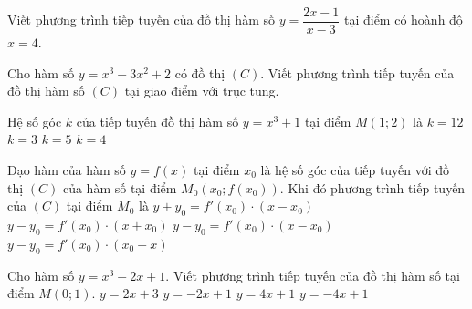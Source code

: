 \begin{ex}%
	Viết phương trình tiếp tuyến của đồ thị hàm số $y=\dfrac{2x-1}{x-3}$ tại điểm có hoành độ $x=4$. 
\end{ex}

\begin{ex}%
	 Cho hàm số $y=x^3-3x^2+2$ có đồ thị $(C)$. Viết phương trình tiếp tuyến của đồ thị hàm số $(C)$ tại giao điểm với trục tung.
\end{ex}

\begin{ex}%
	Hệ số góc $k$ của tiếp tuyến  đồ thị hàm số $y = x^3 + 1$ tại điểm $M(1; 2)$ là
	 \choice
		 {$k = 12$}
		 {\True $k = 3$}
		 {$k = 5$}
		{$k  = 4$}
\end{ex}

\begin{ex}%
	Đạo hàm của hàm số $y= f(x)$ tại điểm $x_0$ là hệ số góc của tiếp tuyến với đồ thị $(C)$ của hàm số tại điểm $M_0(x_0; f(x_0))$. Khi đó phương trình tiếp tuyến của $(C)$ tại điểm $M_0$  là
	\choice 
		{$y+y_0=f'(x_0)\cdot  (x-x_0)$}
		{$y-y_0=f'(x_0)\cdot  (x+x_0)$}
		{\True $y-y_0=f'(x_0)\cdot  (x-x_0)$}
		{$y-y_0=f'(x_0)\cdot  (x_0-x)$}
	\loigiai{ 
	 }
\end{ex}

\begin{ex}%
	Cho hàm số $y= x^3-2x+ 1.$ Viết phương trình  tiếp tuyến của đồ thị hàm số tại điểm $M(0;1)$.
	 \choice
		{$ y=2x  +3$}
		{\True $ y=-2x + 1$} 
		{$ y=4x + 1$} 
		{$ y=-4x + 1$} 
\end{ex}

